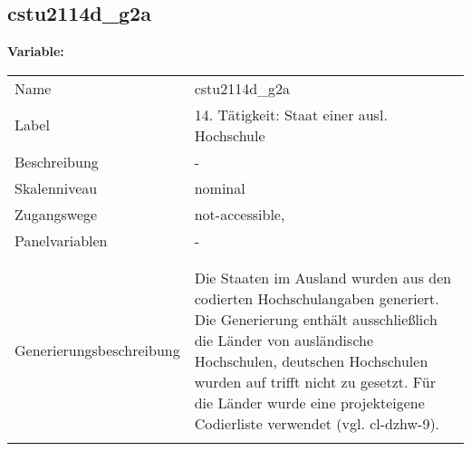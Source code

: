 	
	
	\subsection{cstu2114d\_g2a}
	\label{subSection:cstu2114d_g2a}

	\noindent\textbf{Variable:}\\
		\begin{tabular}{lL{11.3cm}}
			\label{tableVariable:cstu2114d_g2a}
			Name & cstu2114d\_g2a \\
			Label & 14. Tätigkeit: Staat einer ausl. Hochschule \\
			Beschreibung & - \\
			Skalenniveau & nominal \\
			Zugangswege &
				not-accessible,
 \\
			Panelvariablen & -
			 \\
			 \\
 \\
					Generierungsbeschreibung & Die Staaten im Ausland wurden aus den codierten Hochschulangaben generiert. Die Generierung enthält ausschließlich die Länder von ausländische Hochschulen, deutschen Hochschulen wurden auf trifft nicht zu gesetzt. Für die Länder wurde eine projekteigene Codierliste verwendet (vgl. cl-dzhw-9).
				 \\	
			 \\
		\end{tabular}






	
	\newpage
